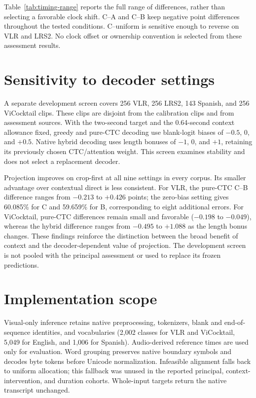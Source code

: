 Table~\ref{tab:timing-range} reports the full range of differences, rather than
selecting a favorable clock shift. C--A and C--B keep negative point
differences throughout the tested conditions. C--uniform is sensitive enough
to reverse on VLR and LRS2. No clock offset or ownership convention is selected
from these assessment results.

\section{Sensitivity to decoder settings}
\label{app:decoder-sensitivity}
A separate development screen covers 256 VLR, 256 LRS2, 143 Spanish, and
256 ViCocktail clips. These clips are disjoint from the calibration clips
and from assessment sources. With the two-second target and the 0.64-second
context allowance fixed, greedy and pure-CTC decoding use blank-logit biases
of $-0.5$, $0$, and $+0.5$. Native hybrid decoding uses length bonuses of
$-1$, $0$, and $+1$, retaining its previously chosen CTC/attention weight.
This screen examines stability and does not select a replacement decoder.

Projection improves on crop-first at all nine settings in every corpus.
Its smaller advantage over contextual direct is less consistent. For VLR,
the pure-CTC C--B difference ranges from $-0.213$ to $+0.426$ points;
the zero-bias setting gives 60.085\% for C and 59.659\% for B, corresponding
to eight additional errors. For ViCocktail, pure-CTC differences remain
small and favorable ($-0.198$ to $-0.049$), whereas the hybrid difference
ranges from $-0.495$ to $+1.088$ as the length bonus changes. These findings
reinforce the distinction between the broad benefit of context and the
decoder-dependent value of projection. The development screen is not pooled
with the principal assessment or used to replace its frozen predictions.

\section{Implementation scope}
Visual-only inference retains native preprocessing, tokenizers, blank and
end-of-sequence identities, and vocabularies (2,002 classes for VLR and
ViCocktail, 5,049 for English, and 1,006 for Spanish). Audio-derived reference
times are used only for evaluation. Word grouping preserves native boundary
symbols and decodes byte tokens before Unicode normalization. Infeasible
alignment falls back to uniform allocation; this fallback was unused in the
reported principal, context-intervention, and duration cohorts. Whole-input
targets return the native transcript unchanged.
